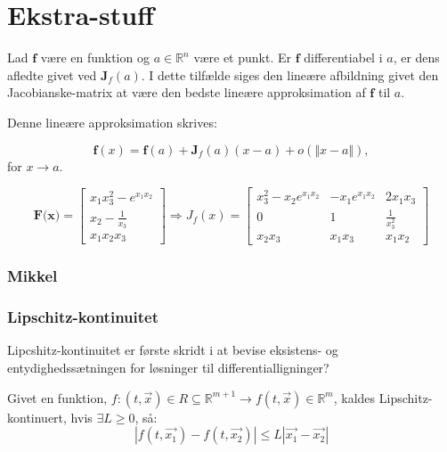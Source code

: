 \chapter{Ekstra-stuff}
\begin{definition}[]
Lad $\textbf{f}$ være en funktion og $a \in \mathbb{R}^n$ være et punkt. Er $\textbf{f}$ differentiabel i $a$, er dens afledte givet ved $\textbf{J}_f({a})$. I dette tilfælde siges den lineære afbildning givet den Jacobianske-matrix at være den bedste lineære approksimation af $\textbf{f}$ til $a$.

\hfill \break
Denne lineære approksimation skrives:

$$\textbf{f}(x)=\textbf{f}(a)+ \textbf{J}_f({a})(x-a)+ o(\left. \Vert \left. x-a \right. \Vert \right.),$$ 
for $x \to a$.

\end{definition}

\begin{definition}
\end{definition}

\begin{Example}

$$\textbf{F(x)} =
\begin{bmatrix}
x_1 x_3^2 -e^{x_1 x_2} \\
x_2 - \frac{1}{x_3} \\
x_1 x_2 x_3
\end{bmatrix} \Rightarrow
J_{f}(x) =
\begin{bmatrix}
    x_3^2 - x_2 e^{x_1 x_2} & -x_1 e^{x_1 x_2} & 2x_1 x_3 \\
    0 & 1 & \frac{1}{x_3^2}\\
    x_2 x_3 & x_1 x_3 & x_1 x_2
\end{bmatrix}$$

\end{Example}
\subsection{Mikkel}

\subsection{Lipschitz-kontinuitet}
Lipcshitz-kontinuitet er første skridt i at bevise eksistens- og entydighedssætningen for løsninger til differentialligninger?
\begin{definition}
Givet en funktion, $f: (t,\vec{x})\in R \subseteq \mathbb{R}^{m+1} \rightarrow f(t,\vec{x}) \in \mathbb{R}^m$, kaldes Lipschitz-kontinuert, hvis $\exists L \geq 0$, så:
$$|f(t,\vec{x_1})-f(t,\vec{x_2})|\leq L|\vec{x_1}-\vec{x_2}|$$
\end{definition}

